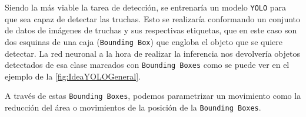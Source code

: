 \begin{enumerate}
    Siendo la más viable la tarea de detección, se entrenaría un modelo \texttt{YOLO} para que sea capaz de detectar las truchas. Esto se realizaría 
    conformando un conjunto de datos de imágenes de truchas y sus respectivas etiquetas, que en este caso son dos esquinas de una caja (\texttt{Bounding Box}) que engloba el 
    objeto que se quiere detectar.\newline
    La red neuronal a la hora de realizar la inferencia nos devolvería objetos detectados de esa clase marcados con \texttt{Bounding Boxes} como se puede ver en el ejemplo de la \autoref{fig:IdeaYOLOGeneral}.
    
    A través de estas \texttt{Bounding Boxes}, podemos parametrizar un movimiento como la reducción del área o movimientos de la posición de la \texttt{Bounding Boxes}.


\end{enumerate}
